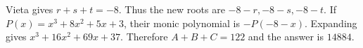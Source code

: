 Vieta gives $r+s+t=-8$. Thus the new roots are $-8-r,-8-s,-8-t$. If $P(x)=x^3+8x^2+5x+3$, their monic polynomial is $-P(-8-x)$. Expanding gives $x^3+16x^2+69x+37$. Therefore $A+B+C=122$ and the answer is $\boxed{14884}$.
